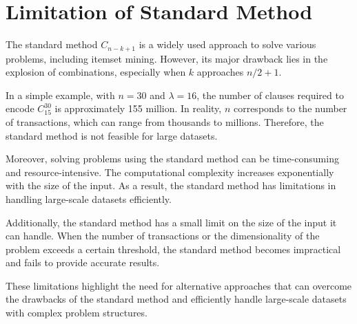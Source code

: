 \section{Limitation of Standard Method}
The standard method $C_{n-k+1}$ is a widely used approach to solve various problems, including itemset mining.
However, its major drawback lies in the explosion of combinations,
especially when $k$ approaches $n / 2 + 1$.

In a simple example, with $n = 30$ and $\lambda = 16$,
the number of clauses required to encode $C_{15}^{30}$ is approximately 155 million.
In reality, $n$ corresponds to the number of transactions, which can range from thousands to millions.
Therefore, the standard method is not feasible for large datasets.

Moreover, solving problems using the standard method can be time-consuming and resource-intensive.
The computational complexity increases exponentially with the size of the input.
As a result, the standard method has limitations in handling large-scale datasets efficiently.

Additionally, the standard method has a small limit on the size of the input it can handle.
When the number of transactions or the dimensionality of the problem exceeds a certain threshold,
the standard method becomes impractical and fails to provide accurate results.

These limitations highlight the need for alternative approaches that can overcome
the drawbacks of the standard method
and efficiently handle large-scale datasets with complex problem structures.
